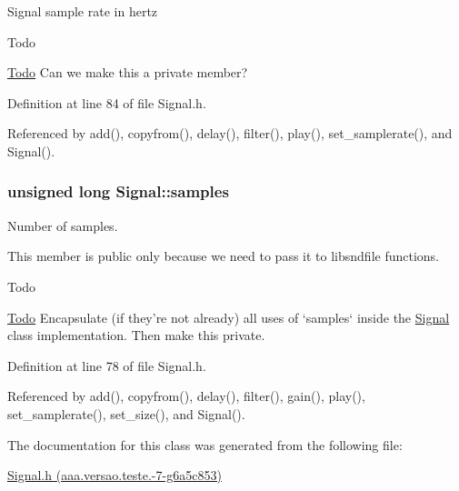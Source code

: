 \-Signal sample rate in hertz 

\begin{DoxyRefDesc}{\-Todo}
\item[\hyperlink{todo__todo000016}{\-Todo}]\-Can we make this a private member? \end{DoxyRefDesc}


\-Definition at line 84 of file \-Signal.\-h.



\-Referenced by add(), copyfrom(), delay(), filter(), play(), set\-\_\-samplerate(), and \-Signal().

\hypertarget{classSignal_a8a51dd9d0f5937b3f3406e66a4d8fc57}{
\subsubsection[{samples}]{\setlength{\rightskip}{0pt plus 5cm}unsigned long {\bf \-Signal\-::samples}}}\label{classSignal_a8a51dd9d0f5937b3f3406e66a4d8fc57}


\-Number of samples. 

\-This member is public only because we need to pass it to libsndfile functions.

\begin{DoxyRefDesc}{\-Todo}
\item[\hyperlink{todo__todo000015}{\-Todo}]\-Encapsulate (if they're not already) all uses of `samples` inside the \hyperlink{classSignal}{\-Signal} class implementation. \-Then make this private. \end{DoxyRefDesc}


\-Definition at line 78 of file \-Signal.\-h.



\-Referenced by add(), copyfrom(), delay(), filter(), gain(), play(), set\-\_\-samplerate(), set\-\_\-size(), and \-Signal().



\-The documentation for this class was generated from the following file\-:\begin{DoxyCompactItemize}
\item 
\hyperlink{Signal_8h}{\-Signal.\-h (aaa.\-versao.\-teste.-\/7-\/g6a5c853)}\end{DoxyCompactItemize}
